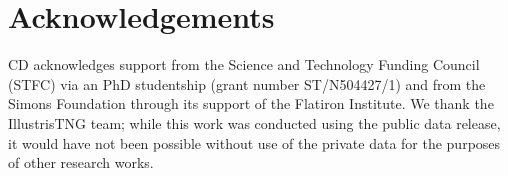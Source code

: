 \documentclass[fleqn,usenatbib]{mnras}
\begin{document}
\section*{Acknowledgements}
CD acknowledges support from the Science and Technology Funding Council (STFC) via an PhD studentship (grant number ST/N504427/1) and from the Simons Foundation through its support of the Flatiron Institute. We thank the IllustrisTNG team; while this work was conducted using the public data release, it would have not been possible without use of the private data for the purposes of other research works. 





 



\bsp	%
\label{lastpage}
\end{document}
